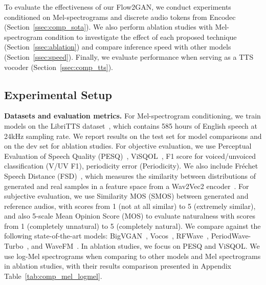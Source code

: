 To evaluate the effectiveness of our Flow2GAN, we conduct experiments conditioned on Mel-spectrograms and discrete audio tokens from Encodec~\citep{encodec} (Section~\ref{ssec:comp_sota}). We also perform ablation studies with Mel-spectrogram condition to investigate the effect of each proposed technique (Section~\ref{ssec:ablation}) and compare inference speed with other models (Section~\ref{ssec:speed}). Finally, we evaluate performance when serving as a TTS vocoder (Section~\ref{ssec:comp_tts}). 

\vspace{-0.5em}
\subsection{Experimental Setup} 
\label{ssec:exp_setup}
\vspace{-0.5em}

\noindent\textbf{Datasets and evaluation metrics.} For Mel-spectrogram conditioning, we train models on the LibriTTS dataset~\citep{libritts}, which contains 585 hours of English speech at 24kHz sampling rate. 
We report results on the test set for model comparisons and on the dev set for ablation studies.
For objective evaluation, we use Perceptual Evaluation of Speech Quality (PESQ)~\citep{pesq}, ViSQOL~\citep{visqol}, F1 score for voiced/unvoiced classification (V/UV F1), periodicity error (Periodicity). We also include Fréchet Speech Distance (FSD)~\citep{voicebox}, which measures the similarity between distributions of generated and real samples in a feature space from a Wav2Vec2 encoder~\citep{wav2vec2}. 
For subjective evaluation, we use Similarity MOS (SMOS) between generated and reference audios, with scores from 1 (not at all similar) to 5 (extremely similar), and also 5-scale Mean Opinion Score (MOS) to evaluate naturalness with scores from 1 (completely unnatural) to 5 (completely natural). 
We compare against the following state-of-the-art models: BigVGAN~\citep{bigvgan}, Vocos~\citep{vocos}, RFWave~\citep{rfwave}, PeriodWave-Turbo~\citep{periodwave_turbo}, and WaveFM~\citep{wavefm}. In ablation studies, we focus on PESQ and ViSQOL. We use log-Mel spectrograms when comparing to other models and Mel spectrograms in ablation studies, with their results comparison presented in Appendix Table~\ref{tab:comp_mel_logmel}.

